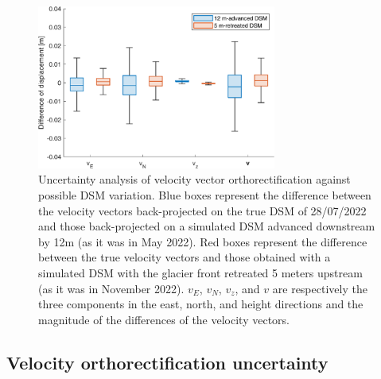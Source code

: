 \begin{figure}[ht]
  \centering
  \includegraphics[width=0.7\textwidth]{4_velocity_ortortect_uncertainty.png}
  \caption{Uncertainty analysis of velocity vector orthorectification against possible
    DSM variation. Blue boxes represent the difference between the velocity vectors
    back-projected on the true DSM of 28/07/2022 and those back-projected on a simulated
    DSM advanced downstream by 12m (as it was in May 2022).
    Red boxes represent the difference between the true velocity vectors and those
    obtained with a simulated DSM with the glacier front retreated 5 meters upstream
    (as it was in November 2022).
    \(v_E\), \(v_N\), \(v_z\), and \(v\) are respectively the three components in the
    east, north, and height directions and the magnitude of the differences of the
    velocity vectors.
  }
  \label{fig:4:velocity_ortortect_uncertainty}
\end{figure}

\subsection{Velocity orthorectification uncertainty}\label{sec:4:res_velocity_uncertainty}

